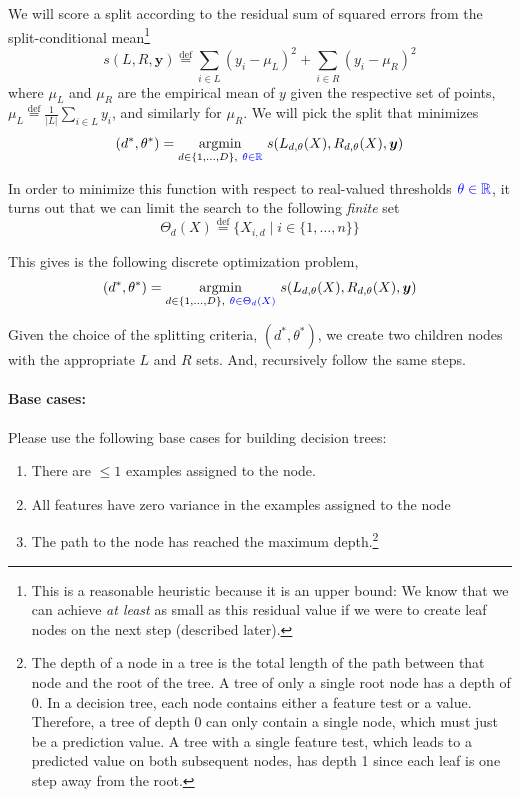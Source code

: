 \documentclass[11pt]{article}
\newcommand{\defeq}{\overset{\text{def}}{=}}
\begin{document}
\noindent We will score a split according to the residual sum of squared errors
from the split-conditional mean\footnote{This is a reasonable heuristic because it
  is an upper bound: We know that we can achieve \emph{at least} as small as
  this residual value if we were to create leaf nodes on the next step (described later).}
%
\begin{equation}\label{eq:split-critera}
  s(L, R, \boldsymbol{y}) \defeq
  \sum_{i \in L } (y_i - \mu_{L})^2
  + \sum_{ i \in R } (y_i - \mu_{R})^2
\end{equation}
%
\noindent where $\mu_{L}$ and $\mu_{R}$ are the empirical mean of $y$ given the
respective set of points, $\mu_{L} \defeq \frac{1}{|L|} \sum_{i \in L} y_i$, and
similarly for $\mu_R$.  We will pick the split that minimizes
%
\begin{equation}
(d^*, \theta^*) = \underset{d \in \{1, \ldots, D \},\ {\color{blue}\theta \in \mathbb{R}}}{\mathrm{argmin}}\ s(L_{d,\theta}(X), R_{d,\theta}(X), \boldsymbol{y})
\end{equation}

\noindent In order to minimize this function with respect to real-valued
thresholds ${\color{blue}\theta \in \mathbb{R}}$, it turns out that we can limit the search to the following \emph{finite} set
\begin{equation}
\Theta_d(X) \defeq \{ X_{i,d} \mid i \in \{1, \ldots, n\} \}
\end{equation}

\noindent This gives is the following discrete optimization problem,
\begin{equation}\label{eq:opt-split}
(d^*, \theta^*) = \underset{d \in \{1, \ldots, D \},\ {\color{blue}\theta \in \Theta_d(X)} }{\mathrm{argmin}}\ s(L_{d,\theta}(X), R_{d,\theta}(X), \boldsymbol{y})
\end{equation}

\noindent Given the choice of the splitting criteria, $(d^*, \theta^*)$, we
create two children nodes with the appropriate $L$ and $R$ sets.  And,
recursively follow the same steps.

\paragraph{Base cases:}
Please use the following base cases for building decision trees:
\begin{enumerate}
\item There are $\le 1$ examples assigned to the node.
\item All features have zero variance in the examples assigned to the node
\item The path to the node has reached the maximum depth.\footnote{The depth of a node in a tree is the total length of the path between that node and the root of the tree. A tree of only a single root node has a depth of 0. In a decision tree, each node contains either a feature test or a value. Therefore, a tree of depth 0 can only contain a single node, which must just be a prediction value. A tree with a single feature test, which leads to a predicted value on both subsequent nodes, has depth 1 since each leaf is one step away from the root.}
\end{enumerate}
\end{document}
